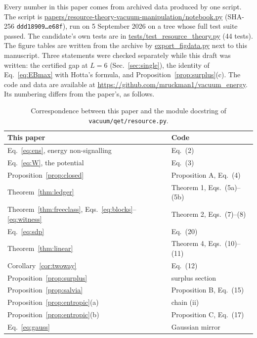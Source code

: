 \documentclass[aps,pra,twocolumn,reprint,superscriptaddress,nofootinbib,floatfix]{revtex4-2}
\theoremstyle{plain}
\theoremstyle{remark}
\begin{document}
Every number in this paper comes from archived data produced by one script. The script is
\url{papers/resource-theory-vacuum-manipulation/notebook.py} (SHA-256
\texttt{ddd18909\ldots e68f}), run on 5 September 2026 on a tree whose full test suite passed.
The candidate's own tests are in \url{tests/test_resource_theory.py} (44 tests). The
figure tables are written from the archive by \url{export_figdata.py} next to this
manuscript. Three statements were checked separately while this draft was written: the
certified gap at $L=6$ (Sec.~\ref{sec:single}), the identity of Eq.~\eqref{eq:EBmax} with
Hotta's formula, and Proposition~\ref{prop:surplus}(c). The code and data are available at
\url{https://github.com/mruckman1/vacuum_energy}. Its numbering differs from the paper's, as
follows.

\begin{table}[h]
\caption{Correspondence between this paper and the module docstring of
\texttt{vacuum/qet/resource.py}.}
\label{tab:map}
\begin{ruledtabular}
\begin{tabular}{ll}
This paper & Code \\
\hline
Eq.~\eqref{eq:ens}, energy non-signalling & Eq.~(2)\\
Eq.~\eqref{eq:W}, the potential & Eq.~(3)\\
Proposition~\ref{prop:closed} & Proposition A, Eq.~(4)\\
Theorem~\ref{thm:ledger} & Theorem 1, Eqs.~(5a)--(5b)\\
Theorem~\ref{thm:freeclass}, Eqs.~\eqref{eq:blocks}--\eqref{eq:witness} & Theorem 2, Eqs.~(7)--(8)\\
Eq.~\eqref{eq:sdp} & Eq.~(20)\\
Theorem~\ref{thm:linear} & Theorem 4, Eqs.~(10)--(11)\\
Corollary~\ref{cor:twoway} & Eq.~(12)\\
Proposition~\ref{prop:surplus} & surplus section\\
Proposition~\ref{prop:salvia} & Proposition B, Eq.~(15)\\
Proposition~\ref{prop:entropic}(a) & chain (ii)\\
Proposition~\ref{prop:entropic}(b) & Proposition C, Eq.~(17)\\
Eq.~\eqref{eq:gauss} & Gaussian mirror\\
\end{tabular}
\end{ruledtabular}
\end{table}


\end{document}
